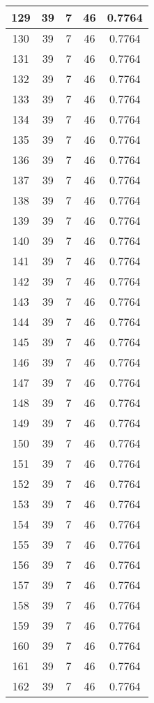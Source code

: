 \documentclass[letterpaper, 12pt]{article}
\begin{document}
\begin{longtable}{|c|c|c|c|c|}
\hline
129 & 39 & 7 & 46 & 0.7764 \\
\hline
130 & 39 & 7 & 46 & 0.7764 \\
\hline
131 & 39 & 7 & 46 & 0.7764 \\
\hline
132 & 39 & 7 & 46 & 0.7764 \\
\hline
133 & 39 & 7 & 46 & 0.7764 \\
\hline
134 & 39 & 7 & 46 & 0.7764 \\
\hline
135 & 39 & 7 & 46 & 0.7764 \\
\hline
136 & 39 & 7 & 46 & 0.7764 \\
\hline
137 & 39 & 7 & 46 & 0.7764 \\
\hline
138 & 39 & 7 & 46 & 0.7764 \\
\hline
139 & 39 & 7 & 46 & 0.7764 \\
\hline
140 & 39 & 7 & 46 & 0.7764 \\
\hline
141 & 39 & 7 & 46 & 0.7764 \\
\hline
142 & 39 & 7 & 46 & 0.7764 \\
\hline
143 & 39 & 7 & 46 & 0.7764 \\
\hline
144 & 39 & 7 & 46 & 0.7764 \\
\hline
145 & 39 & 7 & 46 & 0.7764 \\
\hline
146 & 39 & 7 & 46 & 0.7764 \\
\hline
147 & 39 & 7 & 46 & 0.7764 \\
\hline
148 & 39 & 7 & 46 & 0.7764 \\
\hline
149 & 39 & 7 & 46 & 0.7764 \\
\hline
150 & 39 & 7 & 46 & 0.7764 \\
\hline
151 & 39 & 7 & 46 & 0.7764 \\
\hline
152 & 39 & 7 & 46 & 0.7764 \\
\hline
153 & 39 & 7 & 46 & 0.7764 \\
\hline
154 & 39 & 7 & 46 & 0.7764 \\
\hline
155 & 39 & 7 & 46 & 0.7764 \\
\hline
156 & 39 & 7 & 46 & 0.7764 \\
\hline
157 & 39 & 7 & 46 & 0.7764 \\
\hline
158 & 39 & 7 & 46 & 0.7764 \\
\hline
159 & 39 & 7 & 46 & 0.7764 \\
\hline
160 & 39 & 7 & 46 & 0.7764 \\
\hline
161 & 39 & 7 & 46 & 0.7764 \\
\hline
162 & 39 & 7 & 46 & 0.7764 \\

\end{longtable}
\end{document}
